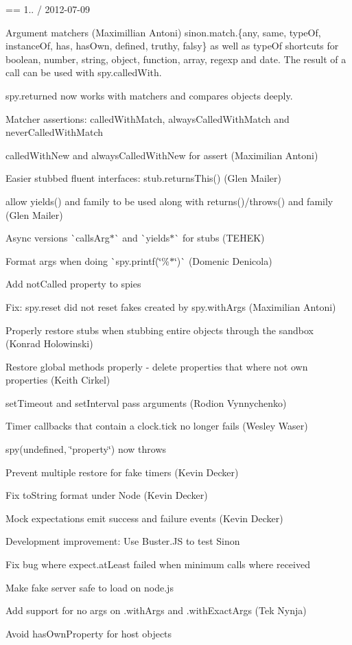 == 1.. / 2012-\/07-\/09
\begin{DoxyItemize}
\item Argument matchers (Maximillian Antoni) sinon.\+match.\{any, same, type\+Of, instance\+Of, has, has\+Own, defined, truthy, falsy\} as well as type\+Of shortcuts for boolean, number, string, object, function, array, regexp and date. The result of a call can be used with spy.\+called\+With.
\item spy.\+returned now works with matchers and compares objects deeply.
\item Matcher assertions\+: called\+With\+Match, always\+Called\+With\+Match and never\+Called\+With\+Match
\item called\+With\+New and always\+Called\+With\+New for assert (Maximilian Antoni)
\item Easier stubbed fluent interfaces\+: stub.\+returns\+This() (Glen Mailer)
\item allow yields() and family to be used along with returns()/throws() and family (Glen Mailer)
\item Async versions \`{}calls\+Arg$\ast$\`{} and \`{}yields$\ast$\`{} for stubs (T\+E\+H\+EK)
\item Format args when doing \`{}spy.printf(\char`\"{}\%$\ast$\char`\"{})\`{} (Domenic Denicola)
\item Add not\+Called property to spies
\item Fix\+: spy.\+reset did not reset fakes created by spy.\+with\+Args (Maximilian Antoni)
\item Properly restore stubs when stubbing entire objects through the sandbox (Konrad Holowinski)
\item Restore global methods properly -\/ delete properties that where not own properties (Keith Cirkel)
\item set\+Timeout and set\+Interval pass arguments (Rodion Vynnychenko)
\item Timer callbacks that contain a clock.\+tick no longer fails (Wesley Waser)
\item spy(undefined, \char`\"{}property\char`\"{}) now throws
\item Prevent multiple restore for fake timers (Kevin Decker)
\item Fix to\+String format under Node (Kevin Decker)
\item Mock expectations emit success and failure events (Kevin Decker)
\item Development improvement\+: Use Buster.\+JS to test Sinon
\item Fix bug where expect.\+at\+Least failed when minimum calls where received
\item Make fake server safe to load on node.\+js
\item Add support for no args on .with\+Args and .with\+Exact\+Args (Tek Nynja)
\item Avoid has\+Own\+Property for host objects
\end{DoxyItemize}

